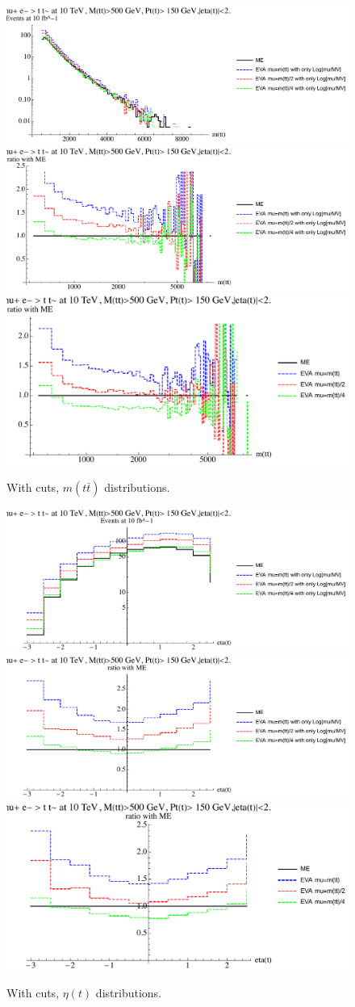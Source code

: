 \documentclass[a4paper,11pt]{article}
\begin{document}
\begin{figure}[!t]
\includegraphics[width=0.46\linewidth]{Notebooks/PlotDistr/WW_tt/10TeVcuts/plotmtt.pdf}
\includegraphics[width=0.46\linewidth]{Notebooks/PlotDistr/WW_tt/10TeVcuts/plotmttratio1.pdf}
\includegraphics[width=0.46\linewidth]{Notebooks/PlotDistr/WW_tt/10TeVcuts/plotmttratio2.pdf}
\caption{With cuts, $m(t \bar t)$ distributions. \label{fig:cutsWWtt}}
\end{figure}


\begin{figure}[!t]
\includegraphics[width=0.46\linewidth]{Notebooks/PlotDistr/WW_tt/10TeVcuts/plotetat.pdf}
\includegraphics[width=0.46\linewidth]{Notebooks/PlotDistr/WW_tt/10TeVcuts/plotetatratio1.pdf}
\includegraphics[width=0.46\linewidth]{Notebooks/PlotDistr/WW_tt/10TeVcuts/plotetatratio2.pdf}
\caption{With cuts, $\eta(t)$ distributions. \label{fig:cutsWWtt2}}
\end{figure}
 
\end{document}
